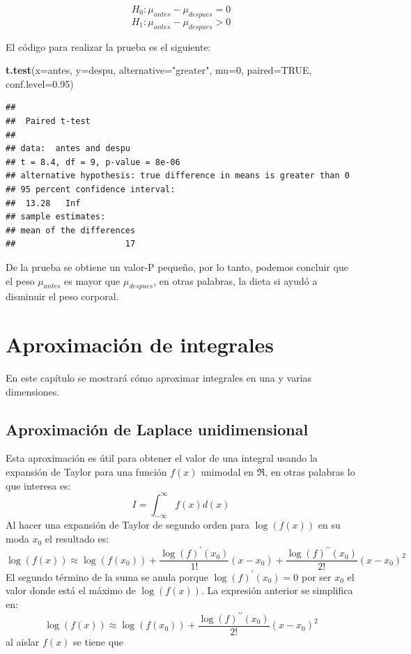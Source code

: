 \documentclass[10pt,]{krantz}
\makeatletter
\newenvironment{Shaded}{\begin{snugshade}}{\end{snugshade}}
\newcommand{\KeywordTok}[1]{\textcolor[rgb]{0.13,0.29,0.53}{\textbf{#1}}}
\newcommand{\DataTypeTok}[1]{\textcolor[rgb]{0.13,0.29,0.53}{#1}}
\newcommand{\DecValTok}[1]{\textcolor[rgb]{0.00,0.00,0.81}{#1}}
\newcommand{\FloatTok}[1]{\textcolor[rgb]{0.00,0.00,0.81}{#1}}
\newcommand{\StringTok}[1]{\textcolor[rgb]{0.31,0.60,0.02}{#1}}
\newcommand{\OtherTok}[1]{\textcolor[rgb]{0.56,0.35,0.01}{#1}}
\newcommand{\NormalTok}[1]{#1}
\newenvironment{kframe}{%
\medskip{}
\setlength{\fboxsep}{.8em}
 \def\at@end@of@kframe{}%
 \ifinner\ifhmode%
  \def\at@end@of@kframe{\end{minipage}}%
  \begin{minipage}{\columnwidth}%
 \fi\fi%
 \def\FrameCommand##1{\hskip\@totalleftmargin \hskip-\fboxsep
 \colorbox{shadecolor}{##1}\hskip-\fboxsep
     \hskip-\linewidth \hskip-\@totalleftmargin \hskip\columnwidth}%
 \MakeFramed {\advance\hsize-\width
   \@totalleftmargin\z@ \linewidth\hsize
   \@setminipage}}%
 {\par\unskip\endMakeFramed%
 \at@end@of@kframe}
\renewenvironment{Shaded}{\begin{kframe}}{\end{kframe}}
\makeatother
\begin{document}
\[H_0: \mu_{antes}  - \mu_{despues} = 0\]
\[H_1: \mu_{antes}  - \mu_{despues} > 0\]

El código para realizar la prueba es el siguiente:

\begin{Shaded}
\begin{Highlighting}[]
\KeywordTok{t.test}\NormalTok{(}\DataTypeTok{x=}\NormalTok{antes, }\DataTypeTok{y=}\NormalTok{despu, }\DataTypeTok{alternative=}\StringTok{"greater"}\NormalTok{, }\DataTypeTok{mu=}\DecValTok{0}\NormalTok{, }
       \DataTypeTok{paired=}\OtherTok{TRUE}\NormalTok{, }\DataTypeTok{conf.level=}\FloatTok{0.95}\NormalTok{)}
\end{Highlighting}
\end{Shaded}

\begin{verbatim}
## 
##  Paired t-test
## 
## data:  antes and despu
## t = 8.4, df = 9, p-value = 8e-06
## alternative hypothesis: true difference in means is greater than 0
## 95 percent confidence interval:
##  13.28   Inf
## sample estimates:
## mean of the differences 
##                      17
\end{verbatim}

De la prueba se obtiene un valor-P pequeño, por lo tanto, podemos
concluir que el peso \(\mu_{antes}\) es mayor que \(\mu_{despues}\), en
otras palabras, la dieta si ayudó a disminuir el peso corporal.

\chapter{\texorpdfstring{Aproximación de integrales
\label{aproxint}}{Aproximación de integrales }}\label{aproximacion-de-integrales}

En este capítulo se mostrará cómo aproximar integrales en una y varias
dimensiones.

\section{Aproximación de Laplace
unidimensional}\label{aproximacion-de-laplace-unidimensional}

Esta aproximación es útil para obtener el valor de una integral usando
la expansión de Taylor para una función \(f(x)\) unimodal en \(\Re\), en
otras palabras lo que interesa es:
\[ I = \int_{-\infty}^{\infty} f(x) d(x)\] Al hacer una expansión de
Taylor de segundo orden para \(\log(f(x))\) en su moda \(x_0\) el
resultado es:
\[ \log(f(x)) \approx \log(f(x_0)) + \frac{\log(f)^\prime(x_0)}{1!} (x-x_0) + \frac{\log(f)^{\prime \prime}(x_0)}{2!} (x-x_0)^2 \]
El segundo término de la suma se anula porque \(\log(f)^\prime(x_0)=0\)
por ser \(x_0\) el valor donde está el máximo de \(\log(f(x))\). La
expresión anterior se simplifica en:
\[ \log(f(x)) \approx \log(f(x_0)) + \frac{\log(f)^{\prime \prime}(x_0)}{2!} (x-x_0)^2 \]
al aislar \(f(x)\) se tiene que
\end{document}
